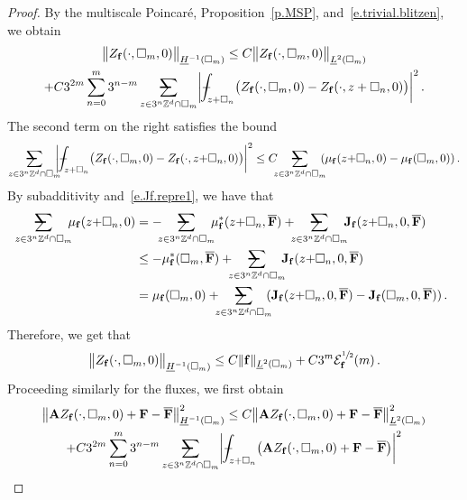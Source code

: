 \documentclass[11pt]{article} %
\makeatletter
\let\oldsquare\square %
\renewcommand{\square}{\oldsquare}
\numberwithin{equation}{section}
\theoremstyle{definition}
\newcommand*{\Z}{\ensuremath{\mathbb{Z}}}
\newcommand{\f}{\mathbf{f}}
\newcommand{\cu}{\square}
\newcommand{\avsum}{\mathop{\mathpalette\avsuminner\relax}\displaylimits}
\newcommand\avsuminner[2]{%
  {\sbox0{$\m@th#1\sum$}%
   \vphantom{\usebox0}%
   \ooalign{%
     \hidewidth
     \smash{\,\rule[.23em]{8.8pt}{1.1pt} \relax}%
     \hidewidth\cr
     $\m@th#1\sum$\cr
   }%
  }%
}
\def\Xint#1{\mathchoice
{\XXint\displaystyle\textstyle{#1}}%
{\XXint\textstyle\scriptstyle{#1}}%
{\XXint\scriptstyle\scriptscriptstyle{#1}}%
{\XXint\scriptscriptstyle\scriptscriptstyle{#1}}%
\!\int}
\def\XXint#1#2#3{{\setbox0=\hbox{$#1{#2#3}{\int}$}
\vcenter{\hbox{$#2#3$}}\kern-.5\wd0}}
\def\fint{\Xint-}
\newcommand{\bfA}{\mathbf{A}}
\newcommand{\bfJ}{\mathbf{J}}
\newcommand{\bfF}{\mathbf{F}}
\makeatother
\begin{document}
\begin{proof}
By the multiscale Poincar\'e, Proposition~\ref{p.MSP}, and~\eqref{e.trivial.blitzen}, we obtain  
\begin{multline*}  
\bigl\| Z_\f(\cdot,\cu_m,0) \bigr\|_{\underline{H}^{-1}(\cu_m)}
\leq
C\bigl\| Z_\f(\cdot,\cu_m,0) \bigr\|_{\underline{L}^{2}(\cu_m)}
\\  
+ 
C3^{2m} \sum_{n=0}^{m} 3^{n-m} \avsum_{z \in 3^n \Z^d \cap \cu_m}    \biggl| \fint_{z + \cu_n} \bigl( Z_\f(\cdot,\cu_m,0) - Z_\f(\cdot,z+\cu_n,0) \bigr)   \biggr|^2 
\,.
\end{multline*}
The second term on the right satisfies the bound
\begin{equation*}  
\avsum_{z \in 3^n \Z^d \cap \cu_m}  \!\!\! \biggl| \fint_{z {+} \cu_n} \bigl( Z_\f(\cdot,\cu_m,0) - Z_\f(\cdot,z{+}\cu_n,0) \bigr)   \biggr|^2 \leq
C   \!\!\!  \avsum_{z \in 3^n \Z^d \cap \cu_m}   \!\!\!  (\mu_\f(z{+}\cu_n,0) - \mu_\f(\cu_m,0) )
\,.
\end{equation*}
By subadditivity and~\eqref{e.Jf.repre1}, we have that
\begin{align*}  
\!\!\! \avsum_{z \in 3^n \Z^d \cap \cu_m} \!\!\!   \mu_\f(z{+}\cu_n,0) 
& =  - 
\!\!\! \avsum_{z \in 3^n \Z^d \cap \cu_m} \!\!\!   \mu_\f^*(z{+}\cu_n,\overline{\bfF})  
+ \!\!\! \avsum_{z \in 3^n \Z^d \cap \cu_m} \!\!\!   \bfJ_\f(z{+}\cu_{n},0,\overline{\bfF})
\\ & 
\leq 
- \mu_\f^*(\cu_m,\overline{\bfF})   +  \!\!\! \avsum_{z \in 3^n \Z^d \cap \cu_m} \!\!\!   \bfJ_\f(z{+}\cu_{n},0,\overline{\bfF})  
\\ & 
=
\mu_\f(\cu_m,0)
+
\!\!\! \avsum_{z \in 3^n \Z^d \cap \cu_m} \!\!\!   ( \bfJ_\f(z{+}\cu_{n},0,\overline{\bfF}) - \bfJ_\f(\cu_{m},0,\overline{\bfF}))\,.
\end{align*}
Therefore, we get that
\begin{equation} \label{e.f.Hminus.average}
\bigl\| Z_\f(\cdot,\cu_m,0) \bigr\|_{\underline{H}^{-1}(\cu_m)}
\leq
C  \| \f \|_{\underline{L}^2(\cu_m)}  + C 3^{m} \mathcal{E}_\f^{\sfrac12}(m)
\,.
\end{equation}
Proceeding similarly for the fluxes, we first obtain 
\begin{multline*}  
\bigl\| \bfA Z_\f(\cdot,\cu_m,0) + \bfF - \overline{\bfF} \bigr\|_{\underline{H}^{-1}(\cu_m)}^2
\leq
C\bigl\| \bfA  Z_\f(\cdot,\cu_m,0) + \bfF - \overline{\bfF} \bigr\|_{\underline{L}^{2}(\cu_m)}^2
\\ 
+ 
C 3^{2m} \sum_{n=0}^{m} 3^{n-m} \avsum_{z \in 3^n \Z^d \cap \cu_m}   \biggl| \fint_{z + \cu_n} \bigl( \bfA  Z_\f(\cdot,\cu_m,0) + \bfF - \overline{\bfF} \bigr) \biggr|^2

\end{multline*}
\end{proof}
\end{document}
